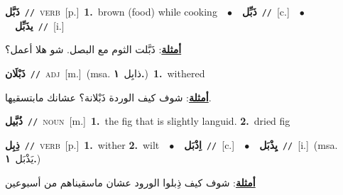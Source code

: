 \documentclass[10pt,a4paper,twoside]{article} %
\begin{document}
\begin{multicols}{2}
{\setlength\topsep{0pt}\textbf{\foreignlanguage{arabic}{ذَبَّل}}\ {\color{gray}\texttt{//}\color{black}}\ \textsc{verb}\ [p.]\ \textbf{1.}~brown (food) while cooking\ \ $\bullet$\ \ \setlength\topsep{0pt}\textbf{\foreignlanguage{arabic}{ذَبِّل}}\ {\color{gray}\texttt{//}\color{black}}\ [c.]\ \ $\bullet$\ \ \setlength\topsep{0pt}\textbf{\foreignlanguage{arabic}{يذَبِّل}}\ {\color{gray}\texttt{//}\color{black}}\ [i.]\  \begin{flushright}\color{gray}\foreignlanguage{arabic}{\textbf{\underline{\foreignlanguage{arabic}{أمثلة}}}: ذَبَّلت الثوم مع البصل. شو هلا أعمل؟}\end{flushright}\color{black}} \vspace{2mm}

{\setlength\topsep{0pt}\textbf{\foreignlanguage{arabic}{ذَبْلَان}}\ {\color{gray}\texttt{//}\color{black}}\ \textsc{adj}\ [m.]\ \color{gray}(msa. \foreignlanguage{arabic}{ذابِل}~\foreignlanguage{arabic}{\textbf{١.}})\color{black}\ \textbf{1.}~withered\  \begin{flushright}\color{gray}\foreignlanguage{arabic}{\textbf{\underline{\foreignlanguage{arabic}{أمثلة}}}: شوف كيف الوردة ذَبْلانة؟ عشانك مابتسقيها.}\end{flushright}\color{black}} \vspace{2mm}

{\setlength\topsep{0pt}\textbf{\foreignlanguage{arabic}{ذُبَّيل}}\ {\color{gray}\texttt{//}\color{black}}\ \textsc{noun}\ [m.]\ \textbf{1.}~the fig that is slightly languid.  \textbf{2.}~dried fig\ } \vspace{2mm}

{\setlength\topsep{0pt}\textbf{\foreignlanguage{arabic}{ذِبِل}}\ {\color{gray}\texttt{//}\color{black}}\ \textsc{verb}\ [p.]\ \textbf{1.}~wither  \textbf{2.}~wilt\ \ $\bullet$\ \ \setlength\topsep{0pt}\textbf{\foreignlanguage{arabic}{اِذْبَل}}\ {\color{gray}\texttt{//}\color{black}}\ [c.]\ \ $\bullet$\ \ \setlength\topsep{0pt}\textbf{\foreignlanguage{arabic}{يِذْبَل}}\ {\color{gray}\texttt{//}\color{black}}\ [i.]\ \color{gray}(msa. \foreignlanguage{arabic}{يَذْبَل}~\foreignlanguage{arabic}{\textbf{١.}})\color{black}\  \begin{flushright}\color{gray}\foreignlanguage{arabic}{\textbf{\underline{\foreignlanguage{arabic}{أمثلة}}}: شوف كيف ذِبلوا الورود عشان ماسقيناهم من أسبوعين}\end{flushright}\color{black}} \vspace{2mm}


\end{multicols}
\end{document}
